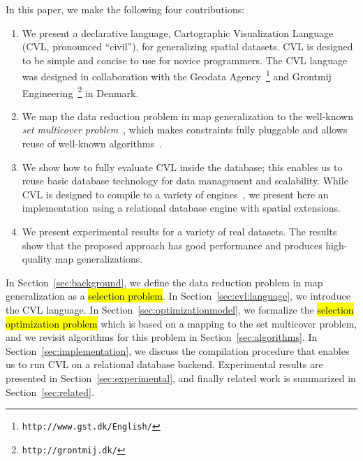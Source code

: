 In this paper, we make the following four contributions:
\begin{enumerate}
\item We present a declarative language, Cartographic Visualization Language (CVL, pronounced ``civil''), for generalizing spatial datasets. CVL is designed to be simple and concise to use for novice programmers. The CVL language was designed in collaboration with the Geodata Agency~\footnote{\texttt{http://www.gst.dk/English/}} and Grontmij Engineering~\footnote{\texttt{http://grontmij.dk/}} in Denmark.

\item We map the data reduction problem in map generalization to the well-known \emph{set multicover problem}~\cite{rajagopalan1998primal}, which makes constraints fully pluggable and allows reuse of well-known algorithms~\cite{rajagopalan1998primal,vazirani2001approximation}.

\item We show how to fully evaluate CVL inside the database; this enables us to reuse basic database technology for data management and scalability. While CVL is designed to compile to a variety of engines~\cite{Stonebraker:2010:PDBMSvsMapReduce}, we present here an implementation using a relational database engine with spatial extensions.

\item We present experimental results for a variety of real datasets. The results show that the proposed approach has good performance and produces high-quality map generalizations.
\end{enumerate}

In Section~\ref{sec:background}, we define the data reduction problem in map generalization as a \hl{selection problem}. In Section~\ref{sec:cvl:language}, we introduce the CVL language. In Section~\ref{sec:optimizationmodel}, we formalize the \hl{selection optimization problem} which is based on a mapping to the set multicover problem, and we revisit algorithms for this problem in Section~\ref{sec:algorithms}. In Section~\ref{sec:implementation}, we discuss the compilation procedure that enables us to run CVL on a relational database backend. Experimental results are presented in Section~\ref{sec:experimental}, and finally related work is summarized in Section~\ref{sec:related}.
